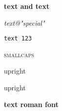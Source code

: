 \documentclass[12pt]{article}
\newcommand\"{quote}
\begin{document}
\textbf{text \command and text}


\textit{text@"special"}

\texttt{text 123}

\textsc{smallcaps}

\textup{upright}


\textmd{upright}


\textbf{text \textrm{roman font}}
\end{document}
